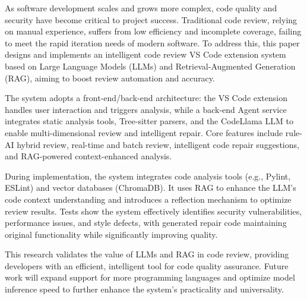 

\begin{abstracten}
As software development scales and grows more complex, code quality and security have become critical to project success. Traditional code review, relying on manual experience, suffers from low efficiency and incomplete coverage, failing to meet the rapid iteration needs of modern software. To address this, this paper designs and implements an intelligent code review VS Code extension system based on Large Language Models (LLMs) and Retrieval-Augmented Generation (RAG), aiming to boost review automation and accuracy.

The system adopts a front-end/back-end architecture: the VS Code extension handles user interaction and triggers analysis, while a back-end Agent service integrates static analysis tools, Tree-sitter parsers, and the CodeLlama LLM to enable multi-dimensional review and intelligent repair. Core features include rule-AI hybrid review, real-time and batch review, intelligent code repair suggestions, and RAG-powered context-enhanced analysis.

During implementation, the system integrates code analysis tools (e.g., Pylint, ESLint) and vector databases (ChromaDB). It uses RAG to enhance the LLM’s code context understanding and introduces a reflection mechanism to optimize review results. Tests show the system effectively identifies security vulnerabilities, performance issues, and style defects, with generated repair code maintaining original functionality while significantly improving quality.

This research validates the value of LLMs and RAG in code review, providing developers with an efficient, intelligent tool for code quality assurance. Future work will expand support for more programming languages and optimize model inference speed to further enhance the system’s practicality and universality.
\end{abstracten}